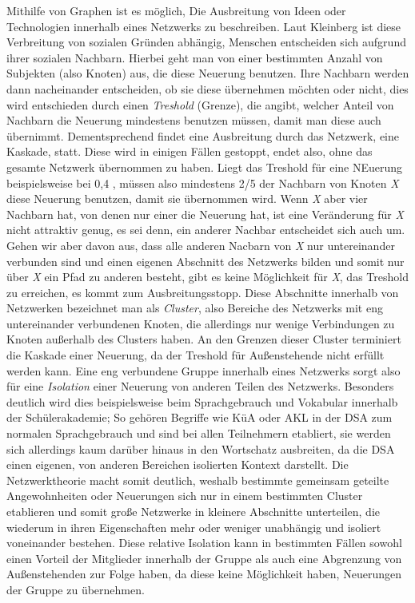 Mithilfe von Graphen ist es möglich, Die Ausbreitung von Ideen oder Technologien innerhalb eines Netzwerks zu beschreiben.
Laut Kleinberg ist diese Verbreitung von sozialen Gründen abhängig, Menschen entscheiden sich aufgrund ihrer sozialen Nachbarn.
Hierbei geht man von einer bestimmten Anzahl von Subjekten (also Knoten) aus, die diese Neuerung benutzen.
Ihre Nachbarn werden dann nacheinander entscheiden, ob sie diese übernehmen möchten oder nicht, dies wird entschieden durch einen \emph{Treshold} (Grenze), die angibt, welcher Anteil von Nachbarn die Neuerung mindestens benutzen müssen, damit man diese auch übernimmt.
Dementsprechend findet eine Ausbreitung durch das Netzwerk, eine Kaskade, statt.
Diese wird in einigen Fällen gestoppt, endet also, ohne das gesamte Netzwerk übernommen zu haben.
Liegt das Treshold für eine NEuerung beispielsweise bei 0,4 , müssen also mindestens 2/5 der Nachbarn von Knoten \emph{X} diese Neuerung benutzen, damit sie übernommen wird.
Wenn \emph{X} aber vier Nachbarn hat, von denen nur einer die Neuerung hat, ist eine Veränderung für \emph{X} nicht attraktiv genug, es sei denn, ein anderer Nachbar entscheidet sich auch um.
Gehen wir aber davon aus, dass alle anderen Nacbarn von \emph{X} nur untereinander verbunden sind und einen eigenen Abschnitt des Netzwerks bilden und somit nur über \emph{X} ein Pfad zu anderen besteht, gibt es keine Möglichkeit für \emph{X}, das Treshold zu erreichen, es kommt zum Ausbreitungsstopp.
Diese Abschnitte innerhalb von Netzwerken bezeichnet man als \emph{Cluster}, also Bereiche des Netzwerks mit eng untereinander verbundenen Knoten, die allerdings nur wenige Verbindungen zu Knoten außerhalb des Clusters haben.
An den Grenzen dieser Cluster terminiert die Kaskade einer Neuerung, da der Treshold für Außenstehende nicht erfüllt werden kann.
Eine eng verbundene Gruppe innerhalb eines Netzwerks sorgt also für eine \emph{Isolation} einer Neuerung von anderen Teilen des Netzwerks.
Besonders deutlich wird dies beispielsweise beim Sprachgebrauch und Vokabular innerhalb der Schülerakademie;
So gehören Begriffe wie KüA oder AKL in der DSA zum normalen Sprachgebrauch und sind bei allen Teilnehmern etabliert, sie werden sich allerdings kaum darüber hinaus in den Wortschatz ausbreiten, da die DSA einen eigenen, von anderen Bereichen isolierten Kontext darstellt.
Die Netzwerktheorie macht somit deutlich, weshalb bestimmte gemeinsam geteilte Angewohnheiten oder Neuerungen sich nur in einem bestimmten Cluster etablieren und somit große Netzwerke in kleinere Abschnitte unterteilen, die wiederum in ihren Eigenschaften mehr oder weniger unabhängig und isoliert voneinander bestehen.
Diese relative Isolation kann in bestimmten Fällen sowohl einen Vorteil der Mitglieder innerhalb der Gruppe als auch eine Abgrenzung von Außenstehenden zur Folge haben, da diese keine Möglichkeit haben, Neuerungen der Gruppe zu übernehmen.

